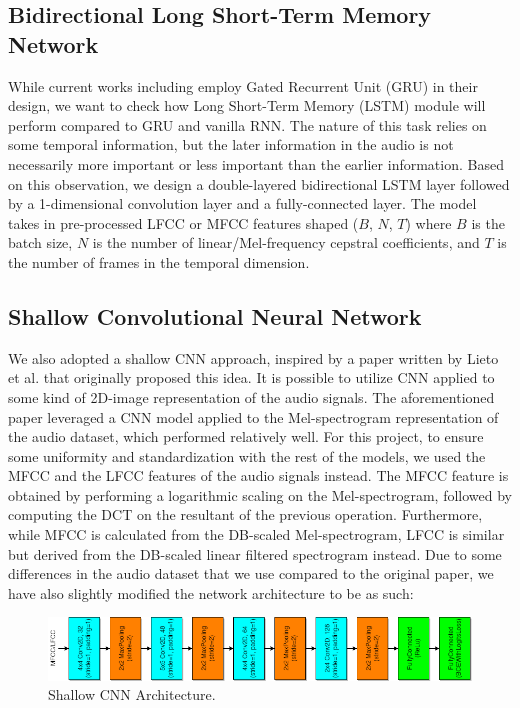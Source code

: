 \documentclass{article}
\begin{document}
\subsection{Bidirectional Long Short-Term Memory Network}

While current works including \cite{JungReplay2019} employ Gated Recurrent Unit (GRU) in their design, we want to check how Long Short-Term Memory (LSTM) module will perform compared to GRU and vanilla RNN. The nature of this task relies on some temporal information, but the later information in the audio is not necessarily more important or less important than the earlier information. Based on this observation, we design a double-layered bidirectional LSTM layer followed by a 1-dimensional convolution layer and a fully-connected layer. The model takes in pre-processed LFCC or MFCC features shaped ($B$, $N$, $T$) where $B$ is the batch size, $N$ is the number of linear/Mel-frequency cepstral coefficients, and $T$ is the number of frames in the temporal dimension.

\subsection{Shallow Convolutional Neural Network}

We also adopted a shallow CNN approach, inspired by a paper written by Lieto et al. \cite{shallowcnn2019} that originally proposed this idea. It is possible to utilize CNN applied to some kind of 2D-image representation of the audio signals. The aforementioned paper leveraged a CNN model applied to the Mel-spectrogram representation of the audio dataset, which performed relatively well. For this project, to ensure some uniformity and standardization with the rest of the models, we used the MFCC and the LFCC features of the audio signals instead. The MFCC feature is obtained by performing a logarithmic scaling on the Mel-spectrogram, followed by computing the DCT on the resultant of the previous operation. Furthermore, while MFCC is calculated from the DB-scaled Mel-spectrogram, LFCC is similar but derived from the DB-scaled linear filtered spectrogram instead. Due to some differences in the audio dataset that we use compared to the original paper, we have also slightly modified the network architecture to be as such:

\begin{figure}[H]
    \centering
    \includegraphics[width=\textwidth]{cnn.png}
    \caption{Shallow CNN Architecture.}
    \label{fig:shallow_cnn_architecture}
\end{figure}
\end{document}
